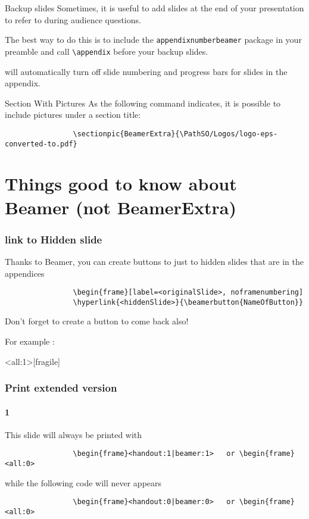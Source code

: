 	
		\begin{frame}[fragile]{Backup slides}
			Sometimes, it is useful to add slides at the end of your presentation to
			refer to during audience questions.
			
			The best way to do this is to include the \verb|appendixnumberbeamer|
			package in your preamble and call \verb|\appendix| before your backup slides.
			
			\themename will automatically turn off slide numbering and progress bars for
			slides in the appendix.
		\end{frame}
		
		\begin{frame}[fragile, label=previouSlide]{Section With Pictures}
			As the following command indicates, it is possible to include pictures under a section title:
			\begin{verbatim}			
				\sectionpic{BeamerExtra}{\PathSO/Logos/logo-eps-converted-to.pdf}		
			\end{verbatim}
		\end{frame}
		
	\section{Things good to know about Beamer (not BeamerExtra)}
		
		\begin{frame}[fragile]
			\frametitle{link to Hidden slide}
			
			Thanks to Beamer, you can create buttons to just to hidden slides that are in the appendices
			\begin{verbatim}			
				\begin{frame}[label=<originalSlide>, noframenumbering]	
				\hyperlink{<hiddenSlide>}{\beamerbutton{NameOfButton}}
			\end{verbatim}
			
			Don't forget to create a button to come back also!
			
			For example :
			\hyperlink{previouSlide}{}
		\end{frame}
		
		\begin{frame}<all:1>[fragile]
			\frametitle{Print extended version}
			\framesubtitle{1}
			
			This slide will always be printed with 
			\begin{verbatim}			
				\begin{frame}<handout:1|beamer:1>	or \begin{frame}<all:0>
			\end{verbatim}
			
			while the following code will never appears
			\begin{verbatim}			
				\begin{frame}<handout:0|beamer:0>	or \begin{frame}<all:0>	
			\end{verbatim}
		\end{frame}
		
